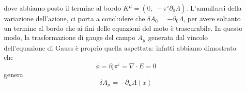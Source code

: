     dove abbiamo posto il termine al bordo $K^\mu = (0, ~- \pi^i \partial_0 \Lambda)$. L'annullarsi della variazione dell'azione, ci porta a concludere che $\delta A_0 = - \partial_0 \Lambda$, per avere soltanto un termine al bordo che ai fini delle equazioni del moto è trascurabile. In questo modo, la trasformazione di gauge del campo $A_\mu$ generata dal vincolo dell'equazione di Gauss è proprio quella aspettata: infatti abbiamo dimostrato che
\begin{equation*}
    \phi = \partial_i \pi^i = \nabla \cdot E = 0
\end{equation*}
    genera 
\begin{equation*}
    \delta A_\mu = - \partial_\mu \Lambda(x)
\end{equation*}